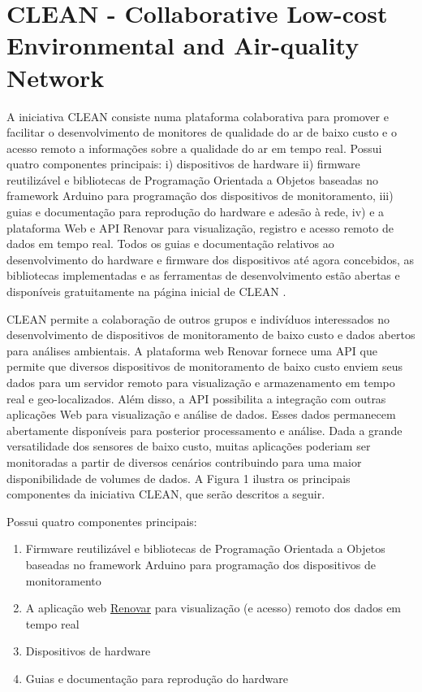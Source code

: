 \chapter{CLEAN - Collaborative Low-cost Environmental and Air-quality Network}\label{cap:clean-initiative}

A iniciativa CLEAN consiste numa plataforma colaborativa para promover e facilitar o desenvolvimento de monitores de qualidade do ar de baixo custo e o acesso remoto a informações sobre a qualidade do ar em tempo real. Possui quatro componentes principais: i) dispositivos de hardware ii) firmware reutilizável e bibliotecas de Programação Orientada a Objetos baseadas no framework Arduino para programação dos dispositivos de monitoramento, iii) guias e documentação para reprodução do hardware e adesão à rede, iv) e a plataforma Web e API Renovar para visualização, registro e acesso remoto de dados em tempo real. Todos os guias e documentação relativos ao desenvolvimento do hardware e firmware dos dispositivos até agora concebidos, as bibliotecas implementadas e as ferramentas de desenvolvimento estão abertas e disponíveis gratuitamente na página inicial de CLEAN \cite{Campo2021}.

CLEAN permite a colaboração de outros grupos e indivíduos interessados no desenvolvimento de dispositivos de monitoramento de baixo custo e dados abertos para análises ambientais. A plataforma web Renovar fornece uma API que permite que diversos dispositivos de monitoramento de baixo custo enviem seus dados para um servidor remoto para visualização e armazenamento em tempo real e geo-localizados. Além disso, a API possibilita a integração com outras aplicações Web para visualização e análise de dados. Esses dados permanecem abertamente disponíveis para posterior processamento e análise. Dada a grande versatilidade dos sensores de baixo custo, muitas aplicações poderiam ser monitoradas a partir de diversos cenários contribuindo para uma maior disponibilidade de volumes de dados. A Figura 1 ilustra os principais componentes da iniciativa CLEAN, que serão descritos a seguir.

Possui quatro componentes principais: 

\begin{enumerate}
    \item Firmware reutilizável e bibliotecas de Programação Orientada a Objetos baseadas no framework Arduino para programação dos dispositivos de monitoramento
    \item A aplicação web \href{http://renovar.lcqar.ufsc.br/}{Renovar} para visualização (e acesso) remoto dos dados em tempo real
    \item Dispositivos de hardware
    \item Guias e documentação para reprodução do hardware
\end{enumerate}

